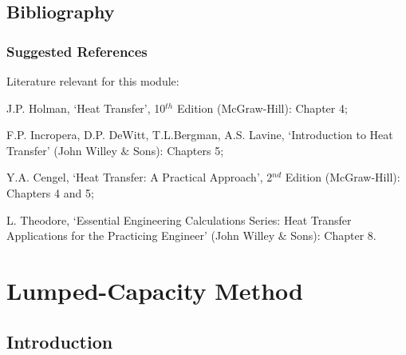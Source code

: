 \documentclass[10pt,compress]{beamer}
\begin{document}
\subsection{Bibliography} 

\begin{frame}
 \frametitle{Suggested References}
  Literature relevant for this module:
  \begin{enumerate}[{[}1{]}]
    \item J.P. Holman, `Heat Transfer', 10$^{th}$ Edition (McGraw-Hill): Chapter 4;
    \item F.P. Incropera, D.P. DeWitt, T.L.Bergman, A.S. Lavine, `Introduction to Heat Transfer' (John Willey $\&$ Sons): Chapters 5;
    \item Y.A. Cengel, `Heat Transfer: A Practical Approach', 2$^{nd}$ Edition (McGraw-Hill): Chapters 4 and 5;
    \item L. Theodore, `Essential Engineering Calculations Series: Heat Transfer Applications for the Practicing Engineer' (John Willey $\&$ Sons): Chapter 8.
  \end{enumerate}
\end{frame}
 

\section{Lumped-Capacity Method}

\subsection{Introduction}
\end{document}
